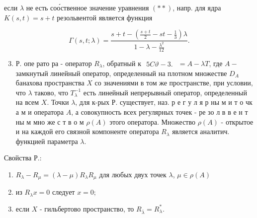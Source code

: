 \documentclass[10pt]{article}
\begin{document}
если $\lambda$ не есть соо́ственное значение уравнения $(* *)$, напр. для ядра $K(s, t)=s+t$ резольвентой является функция



\[

\Gamma(s, t ; \lambda)=\frac{s+t-\left(\frac{s+t}{2}-s t-\frac{1}{3}\right) \lambda}{1-\lambda-\frac{\lambda^{2}}{12}} .

\]



\begin{enumerate}

  \setcounter{enumi}{2}

  \item Р. опе рато ра - оператор $R_{\lambda}$, обратный к $\begin{array}{r}5 C \vartheta-3 .\end{array}$ $=A-\lambda T$, где $A-$ замкнутый линейный оператор, определенный на плотном множестве $D_{A}$ банахова пространства $X$ со значениями в том же пространстве, при условии, что $\lambda$ таково, что $T_{\lambda}^{-1}$ есть линейный непрерывный оператор, определенный на всем $X$. Точки $\lambda$, для к-рых Р. существует, наз. р е г у л я р ны м и т о чк а м и оператора $A$, а совокупность всех регулярных точек - ре зо л в в е н т ны м мно же с т в о м $\rho(A)$ этого оператора. Множество $\rho(A)$ - открытое и на каждой его связной компоненте оператора $R_{\lambda}$ является аналитич. функцией параметра $\lambda$.

\end{enumerate}



Свойства Р.:



\begin{enumerate}

  \item $R_{\lambda}-R_{\mu}=(\lambda-\mu) R_{\lambda} R_{\mu}$ для любых двух точек $\lambda$, $\mu \in \rho(A)$



  \item из $R_{\lambda} x=0$ следует $x=0$;



  \item если $X$ - гильбертово пространство, то $R_{\bar{\lambda}}=R_{\lambda}^{*}$.



\end{enumerate}
\end{document}
